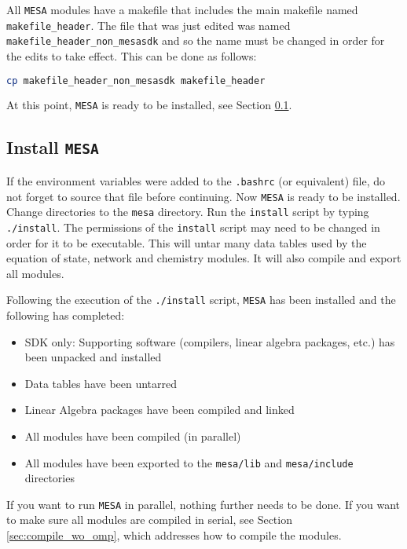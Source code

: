 All {\tt MESA} modules have a makefile that includes the main makefile named 
{\tt makefile\_header}. The file that was just edited was named 
{\tt makefile\_header\_non\_mesasdk} and so the name must be changed in order 
for the edits to take effect. This can be done as follows:
\begin{lstlisting}[language=bash,mathescape=false]
  cp makefile_header_non_mesasdk makefile_header
\end{lstlisting}

At this point, {\tt MESA} is ready to be installed, see Section 
\ref{sec:install}.


\subsection{Install {\tt MESA}}
\label{sec:install}
If the environment variables were added to the {\tt .bashrc} (or equivalent) 
file, do not forget to source that file before continuing. Now {\tt MESA} 
is ready to be installed. Change directories to the {\tt mesa} directory. 
Run the {\tt install} script by typing {\tt ./install}. The permissions of the 
{\tt install} script may need to be changed in order for it to be executable.
This will untar many data tables used by the equation of state, network and 
chemistry modules. It will also compile and export all modules.

Following the execution of the {\tt ./install} script, {\tt MESA} has been 
installed and the following has completed:
\begin{itemize}
\item SDK only: Supporting software (compilers, linear algebra packages, 
etc.) has been unpacked and installed
\item Data tables have been untarred
\item Linear Algebra packages have been compiled and linked
\item All modules have been compiled (in parallel)
\item All modules have been exported to the {\tt mesa/lib} and 
{\tt mesa/include} directories
\end{itemize}

If you want to run {\tt MESA} in parallel, nothing further needs to be done. 
If you want to make sure all modules are compiled in serial, see Section 
\ref{sec:compile_wo_omp}, which addresses how to compile the modules.

